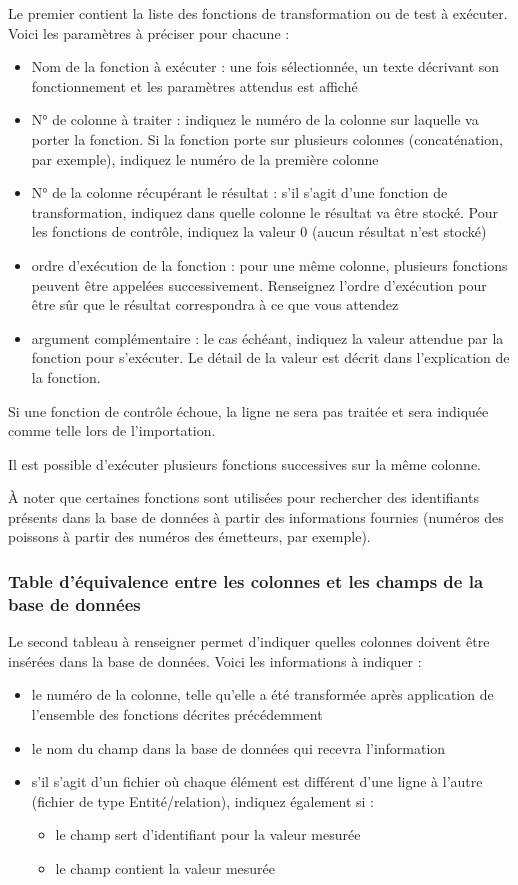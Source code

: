 Le premier contient la liste des fonctions de transformation ou de test à exécuter. Voici les paramètres à préciser pour chacune :
\begin{itemize}
	\item Nom de la fonction à exécuter : une fois sélectionnée, un texte décrivant son fonctionnement et les paramètres attendus est affiché
	\item N° de colonne à traiter : indiquez le numéro de la colonne sur laquelle va porter la fonction. Si la fonction porte sur plusieurs colonnes (concaténation, par exemple), indiquez le numéro de la première colonne
	\item N° de la colonne récupérant le résultat : s'il s'agit d'une fonction de transformation, indiquez dans quelle colonne le résultat va être stocké. Pour les fonctions de contrôle, indiquez la valeur 0 (aucun résultat n'est stocké)
	\item ordre d'exécution de la fonction : pour une même colonne, plusieurs fonctions peuvent être appelées successivement. Renseignez l'ordre d'exécution pour être sûr que le résultat correspondra à ce que vous attendez
	\item argument complémentaire : le cas échéant, indiquez la valeur attendue par la fonction pour s'exécuter. Le détail de la valeur est décrit dans l'explication de la fonction.
\end{itemize}

Si une fonction de contrôle échoue, la ligne ne sera pas traitée et sera indiquée comme telle lors de l'importation.

Il est possible d'exécuter plusieurs fonctions successives sur la même colonne.

À noter que certaines fonctions sont utilisées pour rechercher des identifiants présents dans la base de données à partir des informations fournies (numéros des poissons à partir des numéros des émetteurs, par exemple).

\subsubsection{Table d'équivalence entre les colonnes et les champs de la base de données}

Le second tableau à renseigner permet d'indiquer quelles colonnes doivent être insérées dans la base de données.
Voici les informations à indiquer :
\begin{itemize}
	\item le numéro de la colonne, telle qu'elle a été transformée après application de l'ensemble des fonctions décrites précédemment
	\item le nom du champ dans la base de données qui recevra l'information
	\item s'il s'agit d'un fichier où chaque élément est différent d'une ligne à l'autre (fichier de type Entité/relation), indiquez également si :
	\begin{itemize}
		\item le champ sert d'identifiant pour la valeur mesurée
		\item le champ contient la valeur mesurée
	\end{itemize}
\end{itemize}

